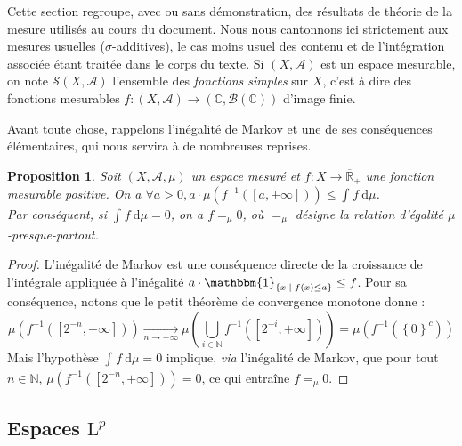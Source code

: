 \documentclass[a4paper,12pt]{article}
\newtheorem{proposition}[theorem]{Proposition}
\newcommand{\R}{\mathbb{R}}
\newcommand{\N}{\mathbb{N}}
\newcommand{\C}{\mathbb{C}}
\newcommand{\Bor}{\mathcal{B}}
\newcommand{\set}[1]{\left\{ #1 \right\}}
\newcommand{\indic}{\mathbbm{1}}
\newcommand{\integral}[4]{\int_{#1}^{#2} #3~\mathrm{d}#4}
\newcommand{\tq}{\;\middle|\;}
\newcommand{\inv}{^{-1}}
\newcommand{\compl}{^c}
\begin{document}
Cette section regroupe, avec ou sans démonstration, des résultats de théorie de la mesure utilisés au cours du document.
Nous nous cantonnons ici strictement aux mesures usuelles ($\sigma$-additives), le cas moins usuel des contenu et de 
l'intégration associée étant traitée dans le corps du texte. 
Si $(X, \mathcal{A})$ est un espace mesurable, on note $\mathscr{S}(X, \mathcal{A})$ l'ensemble des \emph{fonctions simples}
sur $X$, c'est à dire des fonctions mesurables $f : (X, \mathcal{A})\to(\C, \Bor(\C))$ d'image finie. 

Avant toute chose, rappelons l'inégalité de Markov et une de ses conséquences élémentaires, qui nous servira à de nombreuses reprises.
\begin{proposition}\label{markov_and_consequence}
    Soit $(X, \mathcal{A}, \mu)$ un espace mesuré et $f:X\to\overline{\R}_+$ une fonction mesurable positive.
    On a $\forall a>0, a\cdot\mu\left(f\inv([a, +\infty])\right) \le \integral{}{}{f}{\mu}$. \\
    Par conséquent, si $\integral{}{}{f}{\mu} = 0$, on a $f =_\mu 0$, où $=_\mu$ désigne la relation 
    d'égalité $\mu$-presque-partout.
\end{proposition}

\begin{proof}
    L'inégalité de Markov est une conséquence directe de la croissance de l'intégrale appliquée à 
    l'inégalité $a\cdot\indic_{\set{x\tq f(x)\le a}} \le f$. Pour sa conséquence, notons que le petit théorème de convergence monotone donne :
    \begin{equation*}
        \mu(f\inv([2^{-n}, +\infty])) \xrightarrow[n\to+\infty]{} \mu\left(\bigcup_{i\in\N} f\inv([2^{-i}, +\infty])\right) = \mu(f\inv(\set{0}\compl))
    \end{equation*}
    Mais l'hypothèse $\integral{}{}{f}{\mu} = 0$ implique, \emph{via} l'inégalité de Markov, que pour tout $n\in\N$, $\mu(f\inv([2^{-n}, +\infty]))=0$,
    ce qui entraîne $f =_\mu 0$.
\end{proof}

\subsection*{Espaces \texorpdfstring{$\mathrm{L}^p$}{L\textsuperscript{p}}}\label{appendix_Lp}
\end{document}

